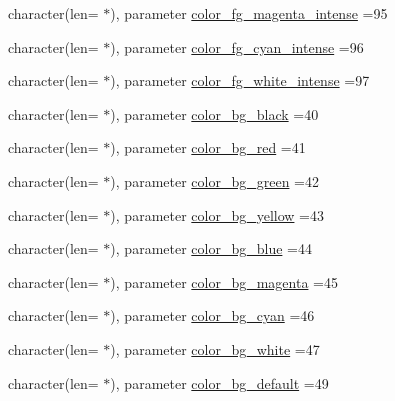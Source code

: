 \begin{DoxyCompactItemize}
\item 
character(len= $\ast$), parameter \mbox{\hyperlink{namespacem__escape_ac47d36c6fed693f69eff29d0046c8f20}{color\+\_\+fg\+\_\+magenta\+\_\+intense}} =\textquotesingle{}95\textquotesingle{}
\item 
character(len= $\ast$), parameter \mbox{\hyperlink{namespacem__escape_a58a755722e6672a1fe8ef98637540105}{color\+\_\+fg\+\_\+cyan\+\_\+intense}} =\textquotesingle{}96\textquotesingle{}
\item 
character(len= $\ast$), parameter \mbox{\hyperlink{namespacem__escape_ac0eb5968bfff3dfa064ec28b5218b2bf}{color\+\_\+fg\+\_\+white\+\_\+intense}} =\textquotesingle{}97\textquotesingle{}
\item 
character(len= $\ast$), parameter \mbox{\hyperlink{namespacem__escape_a5e4fc9941494a5c9518c84b434bfc97b}{color\+\_\+bg\+\_\+black}} =\textquotesingle{}40\textquotesingle{}
\item 
character(len= $\ast$), parameter \mbox{\hyperlink{namespacem__escape_ad219a6232dbaeb100a6e6cdc0365ee22}{color\+\_\+bg\+\_\+red}} =\textquotesingle{}41\textquotesingle{}
\item 
character(len= $\ast$), parameter \mbox{\hyperlink{namespacem__escape_a7c50b2b50909acf5935f9de7642d30f3}{color\+\_\+bg\+\_\+green}} =\textquotesingle{}42\textquotesingle{}
\item 
character(len= $\ast$), parameter \mbox{\hyperlink{namespacem__escape_a7bd0a1c173252170ccf6976b961fa1c3}{color\+\_\+bg\+\_\+yellow}} =\textquotesingle{}43\textquotesingle{}
\item 
character(len= $\ast$), parameter \mbox{\hyperlink{namespacem__escape_a699e7848c3c43f328168d59211d054cc}{color\+\_\+bg\+\_\+blue}} =\textquotesingle{}44\textquotesingle{}
\item 
character(len= $\ast$), parameter \mbox{\hyperlink{namespacem__escape_a73300e9f70a7abb1ec2a2bdb55194ae5}{color\+\_\+bg\+\_\+magenta}} =\textquotesingle{}45\textquotesingle{}
\item 
character(len= $\ast$), parameter \mbox{\hyperlink{namespacem__escape_a895ed90037352c2ce2be6353f6764cb8}{color\+\_\+bg\+\_\+cyan}} =\textquotesingle{}46\textquotesingle{}
\item 
character(len= $\ast$), parameter \mbox{\hyperlink{namespacem__escape_a26cfeb6eefc9cd1a2c9f419db077ecb1}{color\+\_\+bg\+\_\+white}} =\textquotesingle{}47\textquotesingle{}
\item 
character(len= $\ast$), parameter \mbox{\hyperlink{namespacem__escape_af84f93410fbe9fa8fea3b02ac9371833}{color\+\_\+bg\+\_\+default}} =\textquotesingle{}49\textquotesingle{}

\end{DoxyCompactItemize}
